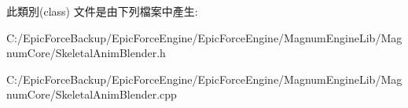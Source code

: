 此類別(class) 文件是由下列檔案中產生\+:\begin{DoxyCompactItemize}
\item 
C\+:/\+Epic\+Force\+Backup/\+Epic\+Force\+Engine/\+Epic\+Force\+Engine/\+Magnum\+Engine\+Lib/\+Magnum\+Core/Skeletal\+Anim\+Blender.\+h\item 
C\+:/\+Epic\+Force\+Backup/\+Epic\+Force\+Engine/\+Epic\+Force\+Engine/\+Magnum\+Engine\+Lib/\+Magnum\+Core/Skeletal\+Anim\+Blender.\+cpp\end{DoxyCompactItemize}
